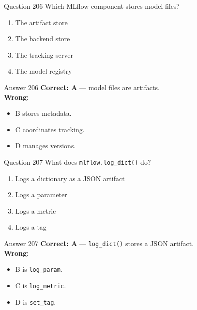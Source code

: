 \documentclass[aspectratio=169,11pt]{beamer}
\begin{document}
	\begin{frame}{Question 206}
		Which MLflow component stores model files?
		\begin{enumerate}[label=\Alph*.]
			\item The artifact store
			\item The backend store
			\item The tracking server
			\item The model registry
		\end{enumerate}
	\end{frame}
	\begin{frame}{Answer 206}
		\textbf{Correct: A} --- model files are artifacts.\\
		\vspace{0.5em}
		\textbf{Wrong:}
		\begin{itemize}
			\item B stores metadata.
			\item C coordinates tracking.
			\item D manages versions.
		\end{itemize}
	\end{frame}
	
	\begin{frame}{Question 207}
		What does \texttt{mlflow.log\_dict()} do?
		\begin{enumerate}[label=\Alph*.]
			\item Logs a dictionary as a JSON artifact
			\item Logs a parameter
			\item Logs a metric
			\item Logs a tag
		\end{enumerate}
	\end{frame}
	\begin{frame}{Answer 207}
		\textbf{Correct: A} --- \texttt{log\_dict()} stores a JSON artifact.\\
		\vspace{0.5em}
		\textbf{Wrong:}
		\begin{itemize}
			\item B is \texttt{log\_param}.
			\item C is \texttt{log\_metric}.
			\item D is \texttt{set\_tag}.
		\end{itemize}
	\end{frame}
	
\end{document}
